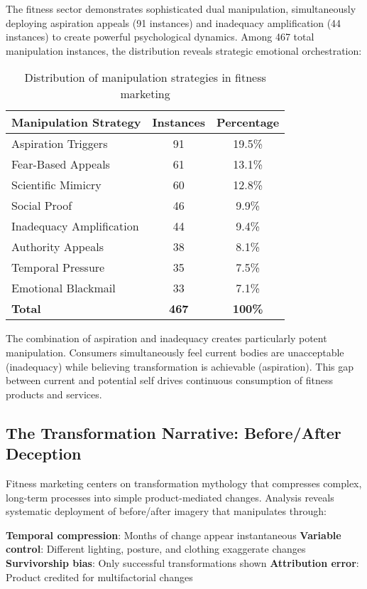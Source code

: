 The fitness sector demonstrates sophisticated dual manipulation, simultaneously deploying aspiration appeals (91 instances) and inadequacy amplification (44 instances) to create powerful psychological dynamics. Among 467 total manipulation instances, the distribution reveals strategic emotional orchestration:

\begin{table}[h]
\centering
\begin{tabular}{|l|c|c|}
\hline
\textbf{Manipulation Strategy} & \textbf{Instances} & \textbf{Percentage} \\
\hline
Aspiration Triggers & 91 & 19.5\% \\
Fear-Based Appeals & 61 & 13.1\% \\
Scientific Mimicry & 60 & 12.8\% \\
Social Proof & 46 & 9.9\% \\
Inadequacy Amplification & 44 & 9.4\% \\
Authority Appeals & 38 & 8.1\% \\
Temporal Pressure & 35 & 7.5\% \\
Emotional Blackmail & 33 & 7.1\% \\
\hline
\textbf{Total} & \textbf{467} & \textbf{100\%} \\
\hline
\end{tabular}
\caption{Distribution of manipulation strategies in fitness marketing}
\end{table}

The combination of aspiration and inadequacy creates particularly potent manipulation. Consumers simultaneously feel current bodies are unacceptable (inadequacy) while believing transformation is achievable (aspiration). This gap between current and potential self drives continuous consumption of fitness products and services.

\subsection{The Transformation Narrative: Before/After Deception}

Fitness marketing centers on transformation mythology that compresses complex, long-term processes into simple product-mediated changes. Analysis reveals systematic deployment of before/after imagery that manipulates through:

\textbf{Temporal compression}: Months of change appear instantaneous
\textbf{Variable control}: Different lighting, posture, and clothing exaggerate changes
\textbf{Survivorship bias}: Only successful transformations shown
\textbf{Attribution error}: Product credited for multifactorial changes

